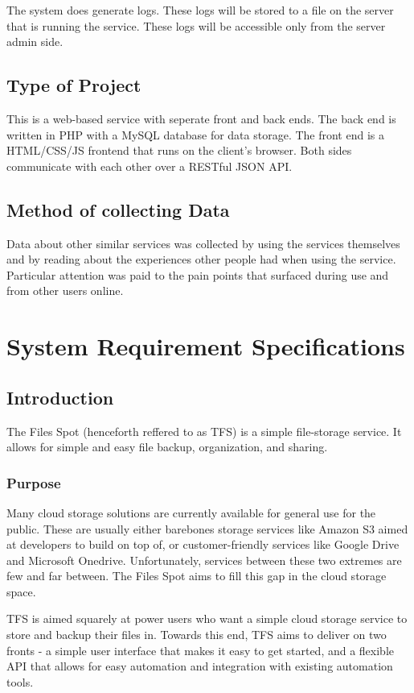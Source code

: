 \documentclass[12pt,a4paper]{report}
\begin{document}
The system does generate logs. These logs will be stored to a file on the server that is running the service. These logs will be accessible only from the server admin side.
\section{Type of Project}\label{sec:type_of_project}
This is a web-based service with seperate front and back ends. The back end is written in PHP with a MySQL database for data storage. The front end is a HTML/CSS/JS frontend that runs on the client's browser. Both sides communicate with each other over a RESTful JSON API.
\section{Method of collecting Data}\label{sec:method_of_collecting_data}
Data about other similar services was collected by using the services themselves and by reading about the experiences other people had when using the service. Particular attention was paid to the pain points that surfaced during use and from other users online.
\newpage
\chapter{System Requirement Specifications}\label{cha:system_requirement_specifications}
\section{Introduction}\label{sec:introduction}
The Files Spot (henceforth reffered to as TFS) is a simple file-storage service. It allows for simple and easy file backup, organization, and sharing.
\subsection{Purpose}
Many cloud storage solutions are currently available for general use for the public. These are usually either barebones storage services like Amazon S3 aimed at developers to build on top of, or customer-friendly services like Google Drive and Microsoft Onedrive. Unfortunately, services between these two extremes are few and far between. The Files Spot aims to fill this gap in the cloud storage space.

TFS is aimed squarely at power users who want a simple cloud storage service to store and backup their files in. Towards this end, TFS aims to deliver on two fronts - a simple user interface that makes it easy to get started, and a flexible API that allows for easy automation and integration with existing automation tools.
\end{document}
